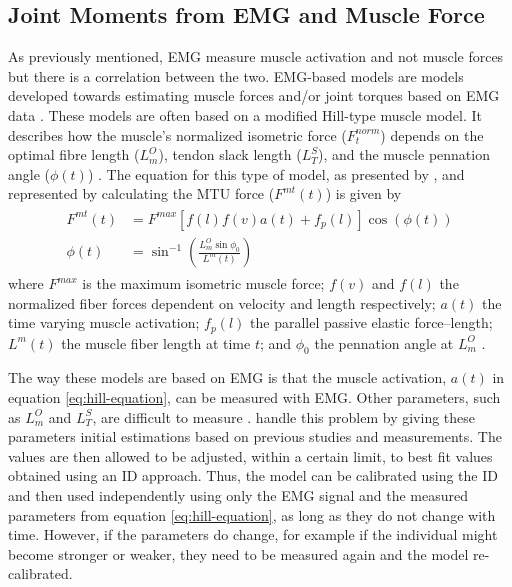 \documentclass[../main.tex]{subfiles}
\begin{document}
\subsection{Joint Moments from \ac{EMG} and Muscle Force}
\label{sec:A-EMGBasedModels}
As previously mentioned, \ac{EMG} measure muscle activation and not muscle forces but there is a correlation between the two.
\ac{EMG}-based models are models developed towards estimating muscle forces and/or joint torques based on \ac{EMG} data \cite{Erdemir2007, Pizzolato2015}.
These models are often based on a modified Hill-type muscle model. 
It describes how the muscle's normalized isometric force  ($F^{norm}_t$) depends on the optimal fibre length ($L^O_m$), tendon slack length ($L^S_T$), and the muscle pennation angle ($\phi (t)$) \cite{Winby2008, Lloyd2003}.
The equation for this type of model, as presented by \textcite{Lloyd2003}, and represented by calculating the \ac{MTU} force ($F^{mt}(t)$) is given by
\begin{align}
\label{eq:hill-equation}
\begin{split}
    F^{mt}(t) &= F^{max} \left[ f(l)f(v)a(t) + f_p(l) \right] \cos{\left(\phi (t)\right)} \\
    \phi (t) &= \sin^{-1}\left( \frac{L^O_m\sin{\phi_0}}{L^m(t)}\right)
\end{split}
\end{align}
where $F^{max}$ is the maximum isometric muscle force; $f(v)$ and $f(l)$ the normalized fiber forces dependent on velocity and length respectively; $a(t)$ the time varying muscle activation; $f_p(l)$ the parallel passive elastic force–length; $L^m(t)$ the muscle fiber length at time $t$; and $\phi_0$ the pennation angle at $L^O_m$ \cite{Buchanan2004, Winby2008, Lloyd2003}.

The way these models are based on \ac{EMG} is that the muscle activation, $a(t)$ in equation \ref{eq:hill-equation}, can be measured with \ac{EMG}.
Other parameters, such as $L^O_m$ and $L^S_T$, are difficult to measure \cite{Winby2008}.
\textcite{Lloyd2003} handle this problem by giving these parameters initial estimations based on previous studies and measurements. 
The values are then allowed to be adjusted, within a certain limit, to best fit values obtained using an \ac{ID} approach.
Thus, the model can be calibrated using the \ac{ID} and then used independently using only the \ac{EMG} signal and the measured parameters from equation \ref{eq:hill-equation}, as long as they do not change with time.
However, if the parameters do change, for example if the individual might become stronger or weaker, they need to be measured again and the model re-calibrated.
\end{document}
